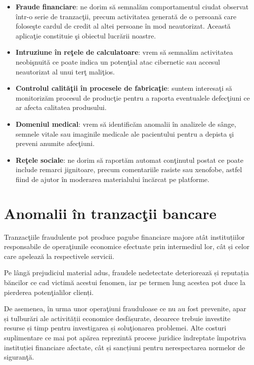 \begin{itemize}
    \item \textbf{Fraude financiare}: ne dorim să semnalăm comportamentul ciudat 
    observat într-o serie de tranzacţii, precum activitatea generată de 
    o persoană care foloseşte cardul de credit al altei persoane în mod 
    neautorizat. Această aplicaţie constituie şi obiectul lucrării noastre\cite{financial-fraud}.
    \item \textbf{Intruziune în reţele de calculatoare}: vrem să semnalăm activitatea
    neobişnuită ce poate indica un potenţial atac cibernetic sau accesul 
    neautorizat al unui terţ maliţios\cite{network-traffic}.
    \item \textbf{Controlul calităţii în procesele de fabricaţie}: suntem interesaţi să monitorizăm 
    procesul de producţie pentru a raporta eventualele defecţiuni ce ar afecta 
    calitatea produsului\cite{quality-control}.
    \item \textbf{Domeniul medical}: vrem să identificăm anomalii în analizele de sânge, 
    semnele vitale sau imaginile medicale ale pacientului pentru a depista şi preveni
    anumite afecţiuni\cite{medical-images}.
    \item \textbf{Reţele sociale}: ne dorim să raportăm automat conţinutul postat ce 
    poate include remarci jignitoare, precum comentariile rasiste sau xenofobe,
    astfel fiind de ajutor în moderarea materialului încărcat pe platforme\cite{social-media}. 
\end{itemize}

\section{Anomalii în tranzacţii bancare}

Tranzacţiile fraudulente pot produce pagube financiare majore 
atât instituțiilor responsabile de operaţiunile economice 
efectuate prin intermediul lor, cât și celor care apelează
la respectivele servicii. 

Pe lângă prejudiciul material adus,
fraudele nedetectate deteriorează și reputația băncilor 
ce cad victimă acestui fenomen, iar pe termen lung acestea
pot duce la pierderea potenţialilor clienți.

De asemenea, în urma unor operaţiuni frauduloase ce nu au 
fost prevenite, apar și tulburări ale activității economice
desfășurate, deoarece trebuie investite resurse și timp 
pentru investigarea și soluţionarea problemei. Alte costuri
suplimentare ce mai pot apărea reprezintă procese juridice 
îndreptate împotriva instituției financiare afectate, cât și 
sancțiuni pentru nerespectarea normelor de siguranţă.

